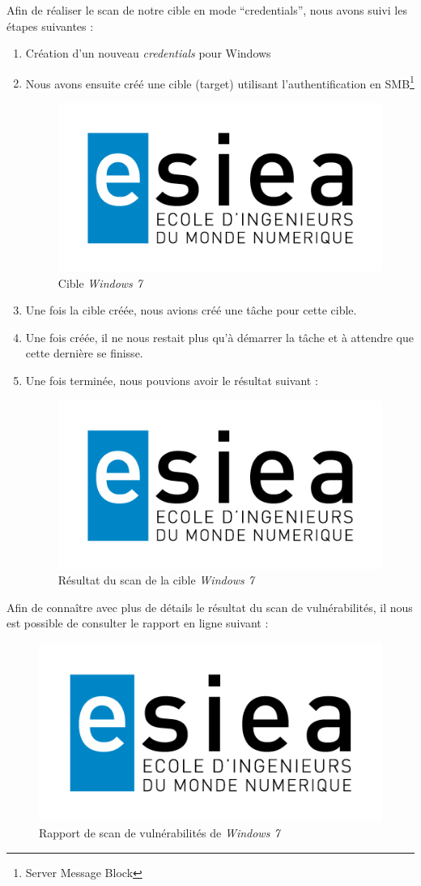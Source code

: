 Afin de réaliser le scan de notre cible en mode \enquote{credentials}, nous avons suivi les étapes suivantes :
\begin{enumerate}
 \item Création d'un nouveau \textit{credentials} pour Windows
 \item Nous avons ensuite créé une cible (target) utilisant l'authentification en SMB\footnote{Server Message Block\cite{SMB}}\\
 \begin{figure}[H]
    \centering
    \includegraphics[width=.7\textwidth]{img/esiea.jpeg}
    \caption{Cible \textit{Windows 7}}
 \end{figure}
 \item Une fois la cible créée, nous avions créé une tâche pour cette cible.
 \item Une fois créée, il ne nous restait plus qu'à démarrer la tâche et à attendre que cette dernière se finisse.
 \item Une fois terminée, nous pouvions avoir le résultat suivant :
 \begin{figure}[H]
    \centering
    \includegraphics[width=.7\textwidth]{img/esiea.jpeg}
    \caption{Résultat du scan de la cible \textit{Windows 7}}
 \end{figure}
\end{enumerate}
Afin de connaître avec plus de détails le résultat du scan de vulnérabilités, il nous est possible de consulter le rapport en ligne suivant :
\begin{figure}[H]
    \centering
    \includegraphics[width=.7\textwidth]{img/esiea.jpeg}
    \caption{Rapport de scan de vulnérabilités de \textit{Windows 7}}
\end{figure}


